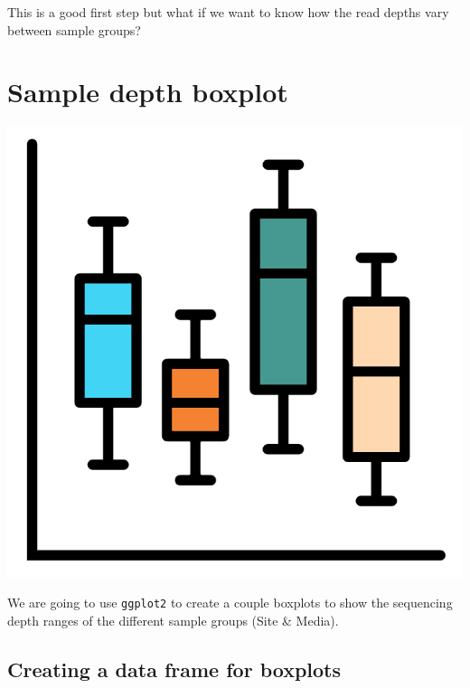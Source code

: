 \documentclass[
]{book}
\begin{document}
This is a good first step but what if we want to know how the read depths vary between sample groups?

\hypertarget{depth-boxplots}{%
\section{Sample depth boxplot}\label{depth-boxplots}}

\includegraphics{figures/boxplot.png}

We are going to use \texttt{ggplot2} to create a couple boxplots to show the sequencing depth ranges of the different sample groups (Site \& Media).

\hypertarget{creating-a-data-frame-for-boxplots}{%
\subsection{Creating a data frame for boxplots}\label{creating-a-data-frame-for-boxplots}}
\end{document}
